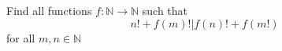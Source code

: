 Find all functions $f:\mathbb{N}\rightarrow\mathbb{N}$ such that$$n!+f(m)!|f(n)!+f(m!)$$for all $m,n\in\mathbb{N}$